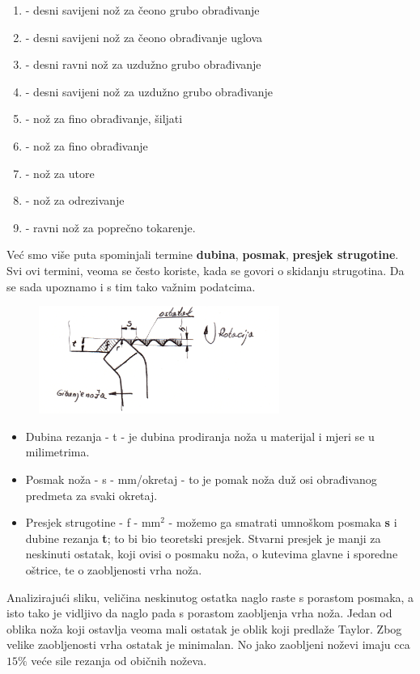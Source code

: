 \documentclass[a4paper,12pt]{article}
\numberwithin{figure}{section}
\begin{document}
\begin{enumerate}
\item - desni savijeni nož za čeono grubo obrađivanje
\item - desni savijeni nož za čeono obrađivanje uglova
\item - desni ravni nož za uzdužno grubo obrađivanje
\item - desni savijeni nož za uzdužno grubo obrađivanje
\item - nož za fino obrađivanje, šiljati
\item - nož za fino obrađivanje
\item - nož za utore
\item - nož za odrezivanje
\item - ravni nož za poprečno tokarenje.
\end{enumerate}
Već smo više puta spominjali termine \textbf{dubina}, \textbf{posmak}, \textbf{presjek strugotine}. Svi ovi termini, veoma se često koriste, kada se govori o skidanju strugotina. Da se sada upoznamo i s tim tako važnim podatcima.
\begin{figure}[!h]
\includegraphics[width=0.7\textwidth]{image_08-1.png}
\end{figure}
\FloatBarrier
\begin{itemize}
\item Dubina rezanja - t - je dubina prodiranja noža u materijal i mjeri se u milimetrima.
\item Posmak noža - s - mm/okretaj - to je pomak noža duž osi obrađivanog predmeta za svaki okretaj.
\item Presjek strugotine - f - mm$^2$ - možemo ga smatrati umnoškom posmaka \textbf{s} i dubine rezanja \textbf{t}; to bi bio teoretski presjek. Stvarni presjek je manji za neskinuti ostatak, koji ovisi o posmaku noža, o kutevima glavne i sporedne oštrice, te o zaobljenosti vrha noža.
\end{itemize}
Analizirajući sliku, veličina neskinutog ostatka naglo raste s porastom posmaka, a isto tako je vidljivo da naglo pada s porastom zaobljenja vrha noža. Jedan od oblika noža koji ostavlja veoma mali ostatak je oblik koji predlaže Taylor. Zbog velike zaobljenosti vrha ostatak je minimalan. No jako zaobljeni noževi imaju cca $15\%$ veće sile rezanja od običnih noževa.
\end{document}
